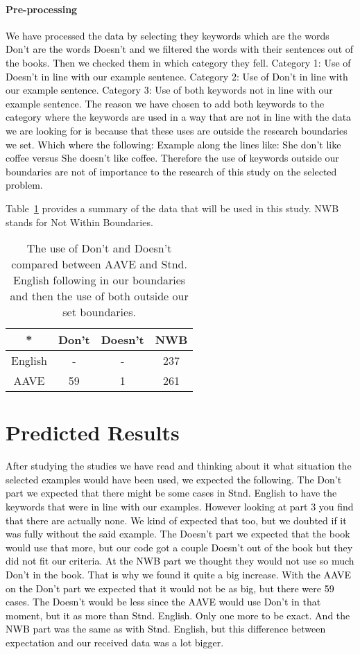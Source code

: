 \documentclass[11pt]{article}
\begin{document}
\paragraph{Pre-processing} \textcolor{black}{We have processed the data by selecting they keywords which are the words Don't are the words Doesn't and we filtered the words with their sentences out of the books. Then we checked them in which category they fell. Category 1: Use of Doesn't in line with our example sentence. Category 2: Use of Don't in line with our example sentence. Category 3: Use of both keywords not in line with our example sentence. The reason we have chosen to add both keywords to the category where the keywords are used in a way that are not in line with the data we are looking for is because that these uses are outside the research boundaries we set. Which where the following: Example along the lines like: She don't like coffee versus She doesn't like coffee. Therefore the use of keywords outside our boundaries are not of importance to the research of this study on the selected problem.}

Table~\ref{tbl:stats} provides a summary of the data that will be used in this study. NWB stands for Not Within Boundaries. 
\begin{table}[hbtp]\centering
\begin{tabular}{|cccc|}
\hline
* & Don't & Doesn't & NWB\\
\hline
English & - & - & 237\\
AAVE & 59 & 1 & 261\\
\hline
\end{tabular}
\caption{The use of Don't and Doesn't compared between AAVE and Stnd. English following in our boundaries and then the use of both outside our set boundaries.}
\label{tbl:stats}
\end{table}


\section{Predicted Results}

\textcolor{black}{After studying the studies we have read and thinking about it what situation the selected examples would have been used, we expected the following. The Don't part we expected that there might be some cases in Stnd. English to have the keywords that were in line with our examples. However looking at part 3 you find that there are actually none. We kind of expected that too, but we doubted if it was fully without the said example. The Doesn't part we expected that the book would use that more, but our code got a couple Doesn't out of the book but they did not fit our criteria. At the NWB part we thought they would not use so much Don't in the book. That is why we found it quite a big increase. With the AAVE on the Don't part we expected that it would not be as big, but there were 59 cases. The Doesn't would be less since the AAVE would use Don't in that moment, but it as more than Stnd. English. Only one more to be exact. And the NWB part was the same as with Stnd. English, but this difference between expectation and our received data was a lot bigger.}
\end{document}
